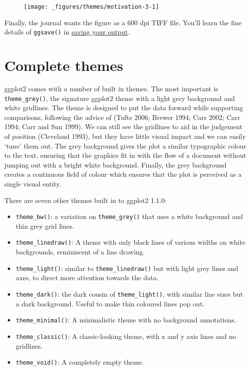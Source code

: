 \begin{figure}[H]
  \centering
  \texttt{[image: \_figures/themes/motivation-3-1]}
\end{figure}

Finally, the journal wants the figure as a 600 dpi TIFF file. You'll
learn the fine details of \texttt{ggsave()} in
\protect\hyperlink{sec:saving}{saving your output}.

\section{Complete themes}\label{sec:themes}

ggplot2 comes with a number of built in themes. The most important is
\texttt{theme\_grey()}, the signature ggplot2 theme with a light grey
background and white gridlines. The theme is designed to put the data
forward while supporting comparisons, following the advice of (Tufte
2006; Brewer 1994; Carr 2002; Carr 1994; Carr and Sun 1999). We can
still see the gridlines to aid in the judgement of position (Cleveland
1993), but they have little visual impact and we can easily `tune' them
out. The grey background gives the plot a similar typographic colour to
the text, ensuring that the graphics fit in with the flow of a document
without jumping out with a bright white background. Finally, the grey
background creates a continuous field of colour which ensures that the
plot is perceived as a single visual entity. 

There are seven other themes built in to ggplot2 1.1.0:

\begin{itemize}
\item
  \texttt{theme\_bw()}: a variation on \texttt{theme\_grey()} that uses
  a white background and thin grey grid lines. 
\item
  \texttt{theme\_linedraw()}: A theme with only black lines of various
  widths on white backgrounds, reminiscent of a line drawing.
\item
  \texttt{theme\_light()}: similar to \texttt{theme\_linedraw()} but
  with light grey lines and axes, to direct more attention towards the
  data. 
\item
  \texttt{theme\_dark()}: the dark cousin of \texttt{theme\_light()},
  with similar line sizes but a dark background. Useful to make thin
  coloured lines pop out. 
\item
  \texttt{theme\_minimal()}: A minimalistic theme with no background
  annotations. 
\item
  \texttt{theme\_classic()}: A classic-looking theme, with x and y axis
  lines and no gridlines. 
\item
  \texttt{theme\_void()}: A completely empty theme. 
\end{itemize}

